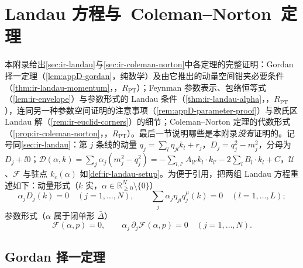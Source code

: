 \chapter{Landau 方程与\ \mbox{Coleman--Norton 定理}}\label{app:appD}

本附录给出\cref{sec:ir-landau}与\cref{sec:ir-coleman-norton}中各定理的完整证明：Gordan 择一定理（\cref{lem:appD-gordan}，纯数学）及由它推出的动量空间钳夹必要条件（\cref{thm:ir-landau-momentum}，\tagR，$R_{\mathrm{PT}}$）；Feynman 参数表示、包络恒等式（\cref{lem:ir-envelope}）与参数形式的 Landau 条件（\cref{thm:ir-landau-alpha}，\tagR，$R_{\mathrm{PT}}$），连同另一种参数空间证明的注意事项（\cref{rem:appD-parameter-proof}）与欧氏区 Landau 解（\cref{rem:ir-euclid-corners}）的细节；Coleman--Norton 定理的代数形式（\cref{prop:ir-coleman-norton}，\tagR，$R_{\mathrm{PT}}$）。最后一节说明哪些是本附录\emph{没有}证明的。记号同\cref{sec:ir-landau}：第 $j$ 条线的动量 $q_j=\sum_l\eta_{jl}k_l+r_j$，$D_j=q_j^2-m_j^2$，分母为 $D_j+\ii0$；$\mathcal D(\alpha,k)=\sum_j\alpha_j(m_j^2-q_j^2)=-\sum_{l,l'}A_{ll'}k_l\cdot k_{l'}-2\sum_lB_l\cdot k_l+C$，$\mathcal U$、$\mathcal F$ 与驻点 $k_c(\alpha)$ 如\cref{def:ir-landau-setup}。为便于引用，把两组 Landau 方程重述如下：动量形式（$k$ 实，$\alpha\in\mathbb R^N_{\ge0}\setminus\{0\}$）
\begin{equation}\label{eq:appD-Lk}
\alpha_jD_j(k)=0\quad(j=1,\dots,N),\qquad \sum_j\alpha_j\eta_{jl}q_j^\mu(k)=0\quad(l=1,\dots,L);
\end{equation}
参数形式（$\alpha$ 属于闭单形 $\bar\Delta$）
\begin{equation}\label{eq:appD-La}
\mathcal F(\alpha,p)=0,\qquad \alpha_j\,\partial_j\mathcal F(\alpha,p)=0\quad(j=1,\dots,N).
\end{equation}

\section{Gordan 择一定理}\label{sec:appD-gordan}

